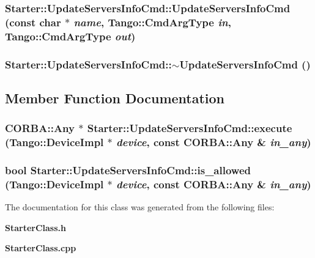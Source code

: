\subsubsection{\setlength{\rightskip}{0pt plus 5cm}Starter::Update\-Servers\-Info\-Cmd::Update\-Servers\-Info\-Cmd (const char $\ast$ {\em name}, Tango::Cmd\-Arg\-Type {\em in}, Tango::Cmd\-Arg\-Type {\em out})}\label{classStarter_1_1UpdateServersInfoCmd_a1}


\subsubsection{\setlength{\rightskip}{0pt plus 5cm}Starter::Update\-Servers\-Info\-Cmd::$\sim$Update\-Servers\-Info\-Cmd ()\hspace{0.3cm}{\tt  [inline]}}\label{classStarter_1_1UpdateServersInfoCmd_a2}




\subsection{Member Function Documentation}
\subsubsection{\setlength{\rightskip}{0pt plus 5cm}CORBA::Any $\ast$ Starter::Update\-Servers\-Info\-Cmd::execute (Tango::Device\-Impl $\ast$ {\em device}, const CORBA::Any \& {\em in\_\-any})\hspace{0.3cm}{\tt  [virtual]}}\label{classStarter_1_1UpdateServersInfoCmd_a4}


\subsubsection{\setlength{\rightskip}{0pt plus 5cm}bool Starter::Update\-Servers\-Info\-Cmd::is\_\-allowed (Tango::Device\-Impl $\ast$ {\em device}, const CORBA::Any \& {\em in\_\-any})\hspace{0.3cm}{\tt  [virtual]}}\label{classStarter_1_1UpdateServersInfoCmd_a3}




The documentation for this class was generated from the following files:\begin{CompactItemize}
\item 
{\bf Starter\-Class.h}\item 
{\bf Starter\-Class.cpp}\end{CompactItemize}
